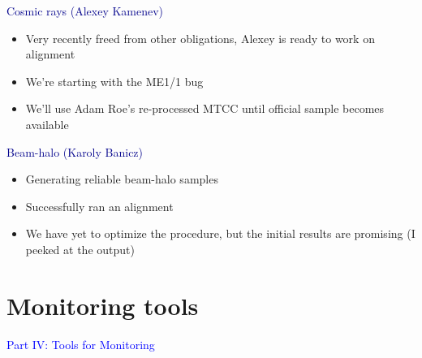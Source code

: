 \documentclass[compress]{beamer}
\begin{document}
\begin{frame}

{\large \textcolor{darkblue}{Cosmic rays (Alexey Kamenev)}}

\vspace{0.1 cm}
\begin{itemize}\setlength{\itemsep}{0.2 cm}
\item Very recently freed from other obligations, Alexey is ready to work on alignment
\item We're starting with the ME1/1 bug
\item We'll use Adam Roe's re-processed MTCC until official sample becomes available
\end{itemize}

\vfill
{\large \textcolor{darkblue}{Beam-halo (Karoly Banicz)}}

\vspace{0.1 cm}
\begin{itemize}\setlength{\itemsep}{0.2 cm}
\item Generating reliable beam-halo samples
\item Successfully ran an alignment
\item We have yet to optimize the procedure, but the initial results
are promising (I peeked at the output)
\end{itemize}
\end{frame}

\section*{Monitoring tools}

\begin{frame}
\begin{center}
\Huge \textcolor{blue}{\sc Part IV: Tools for Monitoring}
\end{center}
\end{frame}
\end{document}
